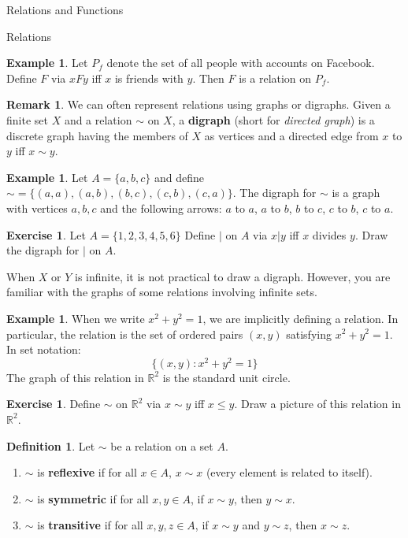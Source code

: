 \documentclass[11pt]{article}
\theoremstyle{definition}
\newtheorem{definition}[theorem]{Definition}
\newtheorem{example}[theorem]{Example}
\newtheorem{exercise}[theorem]{Exercise}
\newtheorem{remark}[theorem]{Remark}
\begin{document}
\begin{section}{Relations and Functions}
\begin{subsection}{Relations}
\begin{example}
Let $P_f$ denote the set of all people with accounts on Facebook.  Define  $F$ via $xFy$ iff $x$ is friends with $y$.  Then $F$ is a relation on $P_f$.
\end{example}

\begin{remark}
We can often represent relations using graphs or digraphs.  Given a finite set $X$ and a relation $\sim$ on $X$, a \textbf{digraph} (short for \emph{directed graph}) is a discrete graph having the members of $X$ as vertices and a directed edge from $x$ to $y$ iff $x\sim y$.
\end{remark}

\begin{example}
Let $A=\{a,b,c\}$ and define $\sim=\{(a,a),(a,b),(b,c),(c,b),(c,a)\}$.  The digraph for $\sim$ is a graph with vertices $a,b,c$ and the following arrows: $a$ to $a$, $a$ to $b$, $b$ to $c$, $c$ to $b$, $c$ to $a$.
\end{example}

\begin{exercise}
Let $A=\{1,2,3,4,5,6\}$  Define $|$ on $A$ via $x|y$ iff $x$ divides $y$.  Draw the digraph for $|$ on $A$.
\end{exercise}

When $X$ or $Y$ is infinite, it is not practical to draw a digraph.  However, you are familiar with the graphs of some relations involving infinite sets.

\begin{example}
When we write $x^2+y^2=1$, we are implicitly defining a relation.  In particular, the relation is the set of ordered pairs $(x,y)$ satisfying $x^2+y^2=1$.  In set notation:
\[
\{(x,y):x^2+y^2=1\}
\]
The graph of this relation in $\mathbb{R}^2$ is the standard unit circle.
\end{example}

\begin{exercise}
Define $\sim$ on $\mathbb{R}^2$ via $x\sim y$ iff $x\leq y$.  Draw a picture of this relation in $\mathbb{R}^2$.
\end{exercise}



\begin{definition}
Let $\sim$ be a relation on a set $A$.
\begin{enumerate}
\item $\sim$ is \textbf{reflexive} if for all $x\in A$, $x\sim x$ (every element is related to itself).
\item $\sim$ is \textbf{symmetric} if for all $x,y\in A$, if $x\sim y$, then $y\sim x$.
\item $\sim$ is \textbf{transitive} if for all $x,y,z\in A$, if $x\sim y$ and $y\sim z$, then $x\sim z$.
\end{enumerate}
\end{definition}


\end{subsection}
\end{section}
\end{document}
